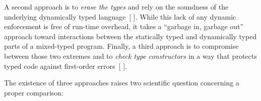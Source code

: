 \documentclass[screen=true, 10pt, acmsmall]{acmart}
\makeatletter
\newcommand{\Sendabbrev}[1]{#1\@}
\newcommand{\AutobibLink}[1]{\color{ACMPurple}{#1}}
\newcommand{\Autobibref}[1]{#1}
\providecommand{\AutobibLink}[1]{#1}
\makeatother
\begin{document}
A second approach is to \textit{erase the types} and rely on the soundness
 of the underlying dynamically typed language\Autobibref{~[\hyperref[t:x28autobib_x22Gavin_Biermanx2c_Martin_Abadix2c_and_Mads_TorgersenUnderstanding_TypeScriptEuropean_Conference_on_Objectx2dOriented_Programmingx2c_ppx2e_257x2dx2d2812014x22x29]{\AutobibLink{Bierman et al\Sendabbrev{.}}} \hyperref[t:x28autobib_x22Gavin_Biermanx2c_Martin_Abadix2c_and_Mads_TorgersenUnderstanding_TypeScriptEuropean_Conference_on_Objectx2dOriented_Programmingx2c_ppx2e_257x2dx2d2812014x22x29]{\AutobibLink{2014}}]}.
 While this lack of any dynamic enforcement is free of run{-}time
 overhead, it takes a {``}garbage in, garbage out{''} approach toward
 interactions between the statically typed and dynamically typed parts of a
 mixed{-}typed program.
Finally, a third approach is to compromise between those two extremes and to
 \textit{check type constructors} in a way that protects typed code against
 first{-}order errors\Autobibref{~[\hyperref[t:x28autobib_x22Michael_Mx2e_Vitousekx2c_Cameron_Swordsx2c_and_Jeremy_Gx2e_SiekBig_Types_in_Little_Runtimex3a_Openx2dWorld_Soundness_and_Collaborative_Blame_for_Gradual_Type_SystemsSymposium_on_Principles_of_Programming_Languagesx2c_ppx2e_762x2dx2d7742017x22x29]{\AutobibLink{Vitousek et al\Sendabbrev{.}}} \hyperref[t:x28autobib_x22Michael_Mx2e_Vitousekx2c_Cameron_Swordsx2c_and_Jeremy_Gx2e_SiekBig_Types_in_Little_Runtimex3a_Openx2dWorld_Soundness_and_Collaborative_Blame_for_Gradual_Type_SystemsSymposium_on_Principles_of_Programming_Languagesx2c_ppx2e_762x2dx2d7742017x22x29]{\AutobibLink{2017}}]}.

The existence of three approaches raises two scientific question concerning
a proper comparison:
\end{document}
